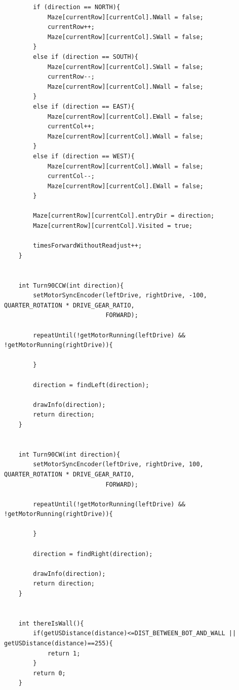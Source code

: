 \documentclass[11pt]{article}
\begin{document}
\begin{linenumbers}
\begin{verbatim}
        if (direction == NORTH){
            Maze[currentRow][currentCol].NWall = false;
            currentRow++;
            Maze[currentRow][currentCol].SWall = false;
        }
        else if (direction == SOUTH){
            Maze[currentRow][currentCol].SWall = false;
            currentRow--;
            Maze[currentRow][currentCol].NWall = false;
        }
        else if (direction == EAST){
            Maze[currentRow][currentCol].EWall = false;
            currentCol++;
            Maze[currentRow][currentCol].WWall = false;
        }
        else if (direction == WEST){
            Maze[currentRow][currentCol].WWall = false;
            currentCol--;
            Maze[currentRow][currentCol].EWall = false;
        }

        Maze[currentRow][currentCol].entryDir = direction;
        Maze[currentRow][currentCol].Visited = true;

        timesForwardWithoutReadjust++;
    }


    int Turn90CCW(int direction){
        setMotorSyncEncoder(leftDrive, rightDrive, -100, QUARTER_ROTATION * DRIVE_GEAR_RATIO, 
                            FORWARD);

        repeatUntil(!getMotorRunning(leftDrive) && !getMotorRunning(rightDrive)){

        }

        direction = findLeft(direction);

        drawInfo(direction);
        return direction;
    }


    int Turn90CW(int direction){
        setMotorSyncEncoder(leftDrive, rightDrive, 100, QUARTER_ROTATION * DRIVE_GEAR_RATIO,
                            FORWARD);

        repeatUntil(!getMotorRunning(leftDrive) && !getMotorRunning(rightDrive)){

        }

        direction = findRight(direction);

        drawInfo(direction);
        return direction;
    }


    int thereIsWall(){
        if(getUSDistance(distance)<=DIST_BETWEEN_BOT_AND_WALL || getUSDistance(distance)==255){
            return 1;
        }
        return 0;
    }



\end{verbatim}
\end{linenumbers}
\end{document}
